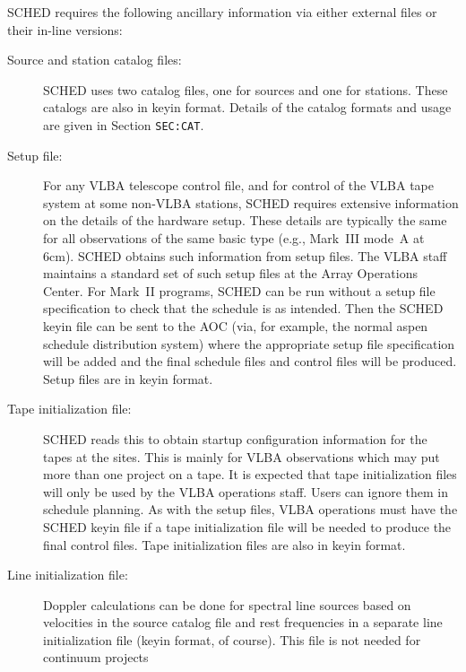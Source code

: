 {\sc SCHED} requires the following ancillary information via either
external files or their in-line versions:
\begin{description}
\item [Source and station catalog files:] {\sc SCHED} uses two 
catalog files, one for sources and one for stations. These catalogs
are also in keyin format. Details of the catalog formats and usage are
given in Section {\tt SEC:CAT}.

\item [Setup file:] For any VLBA telescope control file, and for 
control of the VLBA tape system at some non-VLBA stations, {\sc SCHED}
requires extensive information on the details of the hardware
setup. These details are typically the same for all observations of
the same basic type (e.g., Mark~III mode~A at 6cm). {\sc SCHED}
obtains such information from setup files. The VLBA staff maintains a
standard set of such setup files at the Array Operations Center. For
Mark~II programs, {\sc SCHED} can be run without a setup file
specification to check that the schedule is as intended. Then the {\sc
SCHED} keyin file can be sent to the AOC (via, for example, the normal
aspen schedule distribution system) where the appropriate setup file
specification will be added and the final schedule files and control
files will be produced. Setup files are in keyin format.

\item [Tape initialization file:] {\sc SCHED} reads this to obtain 
startup configuration information for the tapes at the sites. This is
mainly for VLBA observations which may put more than one project on a
tape. It is expected that tape initialization files will only be used
by the VLBA operations staff. Users can ignore them in schedule
planning. As with the setup files, VLBA operations must have the {\sc
SCHED} keyin file if a tape initialization file will be needed to
produce the final control files. Tape initialization files are also in
keyin format.

\item [Line initialization file:] Doppler calculations can be 
done for spectral line sources based on velocities in the source
catalog file and rest frequencies in a separate line initialization
file (keyin format, of course). This file is not needed for continuum
projects
\end{description}

